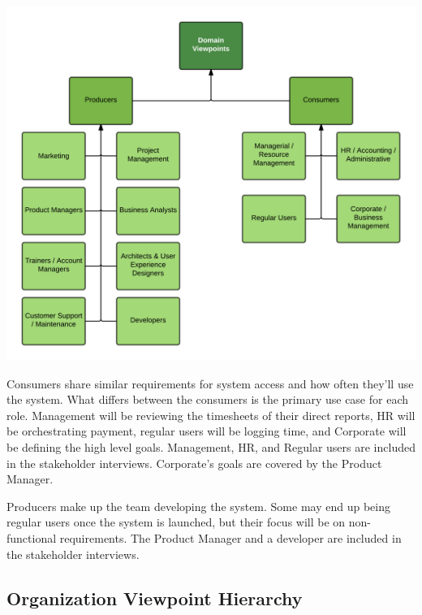 \documentclass[12pt]{article}
\begin{document}
\begin{center}
	\includegraphics{Graphs/DomainView}
\end{center}
Consumers share similar requirements for system access and how often they’ll use the system. What differs between the consumers is the primary use case for each role. Management will be reviewing the timesheets of their direct reports, HR will be orchestrating payment, regular users will be logging time, and Corporate will be defining the high level goals. Management, HR, and Regular users are included in the stakeholder interviews. Corporate’s goals are covered by the Product Manager.

Producers make up the team developing the system. Some may end up being regular users once the system is launched, but their focus will be on non-functional requirements. The Product Manager and a developer are included in the stakeholder interviews.

\subsection{Organization Viewpoint Hierarchy}
\end{document}
